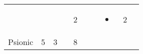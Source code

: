 \documentclass[12pt]{article}
\newcommand{\indexClass}[1]{\index{#1}}
\newcommand{\class}[1]{#1\indexClass{#1}}
\begin{document}
\begin{longtable}[]{@{}llllllllll@{}}
\begin{minipage}[t]{0.06\columnwidth}\raggedright\strut
\strut\end{minipage} &
\begin{minipage}[t]{0.06\columnwidth}\raggedright\strut
\strut\end{minipage} &
\begin{minipage}[t]{0.06\columnwidth}\raggedright\strut
\strut\end{minipage} &
\begin{minipage}[t]{0.06\columnwidth}\raggedright\strut
\strut\end{minipage} &
\begin{minipage}[t]{0.06\columnwidth}\raggedright\strut
2
\strut\end{minipage} &
\begin{minipage}[t]{0.06\columnwidth}\raggedright\strut
\strut\end{minipage} &
\begin{minipage}[t]{0.06\columnwidth}\raggedright\strut
\strut\end{minipage} &
\begin{minipage}[t]{0.07\columnwidth}\raggedright\strut
\begin{itemize}
\item
\end{itemize}
\strut\end{minipage} &
\begin{minipage}[t]{0.08\columnwidth}\raggedright\strut
2
\strut\end{minipage}\tabularnewline
\begin{minipage}[t]{0.13\columnwidth}\raggedright\strut
\class{Psionic}
\strut\end{minipage} &
\begin{minipage}[t]{0.06\columnwidth}\raggedright\strut
5
\strut\end{minipage} &
\begin{minipage}[t]{0.06\columnwidth}\raggedright\strut
3
\strut\end{minipage} &
\begin{minipage}[t]{0.06\columnwidth}\raggedright\strut
\strut\end{minipage} &
\begin{minipage}[t]{0.06\columnwidth}\raggedright\strut
8
\strut\end{minipage} &
\begin{minipage}[t]{0.06\columnwidth}\raggedright\strut
\strut\end{minipage} &
\begin{minipage}[t]{0.06\columnwidth}\raggedright\strut

\end{minipage}
\end{longtable}
\end{document}
